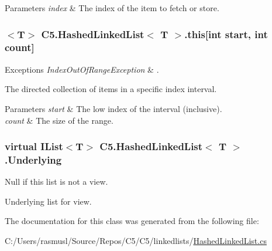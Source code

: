 \begin{DoxyParams}{Parameters}
{\em index} & The index of the item to fetch or store.\\
\hline
\end{DoxyParams}
\hypertarget{class_c5_1_1_hashed_linked_list_aaf5b40fcd1eaa99ad9d4a0127f286e3f}{}
\subsubsection[{this[int start, int count]}]{$<$T$>$ {\bf C5.\+Hashed\+Linked\+List}$<$ T $>$.this\mbox{[}int start, int count\mbox{]}\hspace{0.3cm}{\ttfamily [get]}}\label{class_c5_1_1_hashed_linked_list_aaf5b40fcd1eaa99ad9d4a0127f286e3f}



\begin{DoxyExceptions}{Exceptions}
{\em Index\+Out\+Of\+Range\+Exception} & . \\
\hline
\end{DoxyExceptions}


The directed collection of items in a specific index interval.


\begin{DoxyParams}{Parameters}
{\em start} & The low index of the interval (inclusive).\\
\hline
{\em count} & The size of the range.\\
\hline
\end{DoxyParams}
\hypertarget{class_c5_1_1_hashed_linked_list_ab70556e117c40bfeea64e24daa937955}{}
\subsubsection[{Underlying}]{\setlength{\rightskip}{0pt plus 5cm}virtual {\bf I\+List}$<$T$>$ {\bf C5.\+Hashed\+Linked\+List}$<$ T $>$.Underlying\hspace{0.3cm}{\ttfamily [get]}}\label{class_c5_1_1_hashed_linked_list_ab70556e117c40bfeea64e24daa937955}


Null if this list is not a view. 

Underlying list for view.

The documentation for this class was generated from the following file\+:\begin{DoxyCompactItemize}
\item 
C\+:/\+Users/rasmusl/\+Source/\+Repos/\+C5/\+C5/linkedlists/\hyperlink{_hashed_linked_list_8cs}{Hashed\+Linked\+List.\+cs}\end{DoxyCompactItemize}
